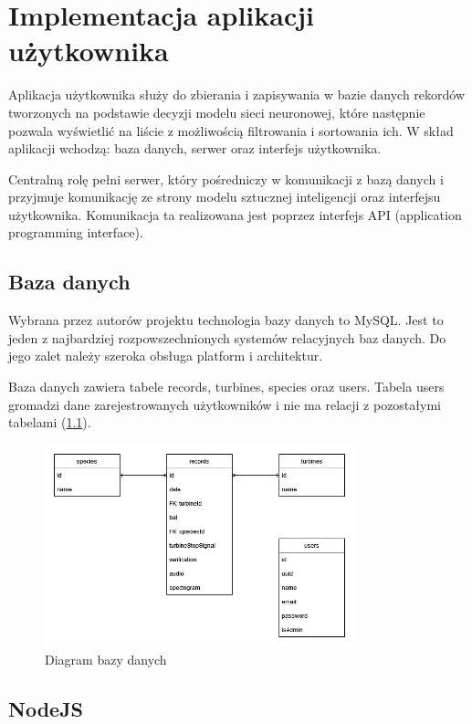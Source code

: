 \documentclass{sprz}
\begin{document}
\chapter{Implementacja aplikacji użytkownika}

Aplikacja użytkownika służy do zbierania i zapisywania w bazie danych rekordów tworzonych na podstawie decyzji modelu sieci neuronowej, które następnie pozwala wyświetlić na liście z możliwością filtrowania i sortowania ich. W skład aplikacji wchodzą: baza danych, serwer oraz interfejs użytkownika.

Centralną rolę pełni serwer, który pośredniczy w komunikacji z bazą danych i przyjmuje komunikację ze strony modelu sztucznej inteligencji oraz interfejsu użytkownika. Komunikacja ta realizowana jest poprzez interfejs API (application programming interface).
\clearpage

\section{Baza danych}

Wybrana przez autorów projektu technologia bazy danych to MySQL. Jest to jeden z najbardziej rozpowszechnionych systemów relacyjnych baz danych. Do jego zalet należy szeroka obsługa platform i architektur.

Baza danych zawiera tabele records, turbines, species oraz users. Tabela users gromadzi dane zarejestrowanych użytkowników i nie ma relacji z pozostałymi tabelami (\ref{img:db_diagram}).

\begin{figure}[h]
  \centering
  \includegraphics[width=0.8\textwidth]{sprz/db_diagram}
  \caption{Diagram bazy danych}
  \label{img:db_diagram}
\end{figure}

\section{NodeJS}
\end{document}

